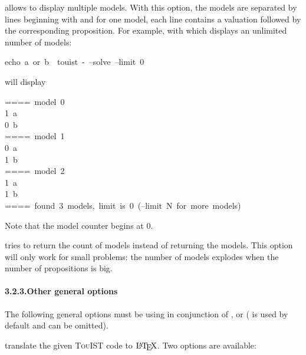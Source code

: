 \textbf{} allows to display multiple models. With this option,
the models are separated by lines beginning with \mdcode{====} and for one model,
each line contains a valuation followed by the corresponding proposition.
For example, with  which displays an unlimited number of models:%
\begin{mdpre}%
\noindent{}echo~a~or~b~\textbar{}~touist~-~--solve~--limit~0%
\end{mdpre}\noindent will display
\begin{mdpre}%
\noindent{}====~model~0\\
1~a\\
0~b\\
====~model~1\\
0~a\\
1~b\\
====~model~2\\
1~a\\
1~b\\
====~found~3~models,~limit~is~0~(--limit~N~for~more~models)%
\end{mdpre}\noindent Note that the model counter begins at 0.

\textbf{} tries to return the count of models instead of
returning the models. This option will only work for small problems: the
number of models explodes when the number of propositions is big.%

\paragraph*{3.2.3.\hspace*{0.5em}Other general options}\label{usage-general-options}%

\noindent The following general options must be using in conjunction of 
,  or  ( is used by default and can be omitted).%

\textbf{} translate the given {\scshape TouIST} code to $\mbox{\LaTeX}$. Two
options are available:%

